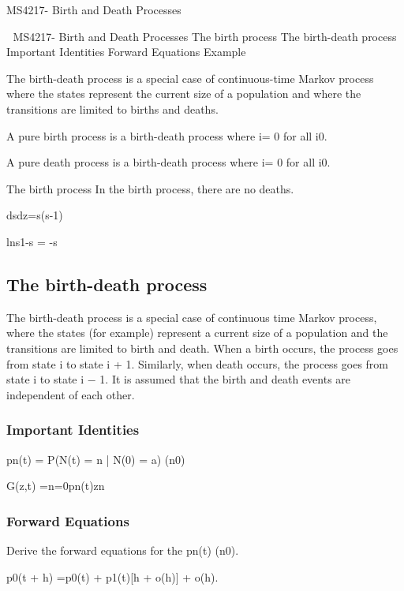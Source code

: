 MS4217-  Birth and Death Processes


MS4217-  Birth and Death Processes
The birth process
The birth-death process
Important Identities
Forward Equations
Example


The birth-death process is a special case of continuous-time Markov process where the states represent the current size of a population and where the transitions are limited to births  and deaths.

A pure birth process is a birth-death process where i= 0 for all i0.

A pure death process is a birth-death process where i= 0 for all i0.

The birth process
In the birth process, there are no deaths.

dsdz=s(s-1)

lns1-s = -s




\subsection*{The birth-death process}
The birth-death process is a special case of continuous time Markov process, where the states (for example) represent a current size of a population and the transitions are limited to birth and death. When a birth occurs, the process goes from state i to state i + 1. Similarly, when death occurs, the process goes from state i to state i − 1. It is assumed that the birth and death events are independent of each other.

\subsubsection*{Important Identities}


pn(t) = P(N(t) = n | N(0) = a)					(n0)

G(z,t) =n=0pn(t)zn


\subsubsection*{Forward Equations}

Derive the forward equations for the pn(t) (n0).

p0(t + h) =p0(t) + p1(t)[h + o(h)] + o(h).



